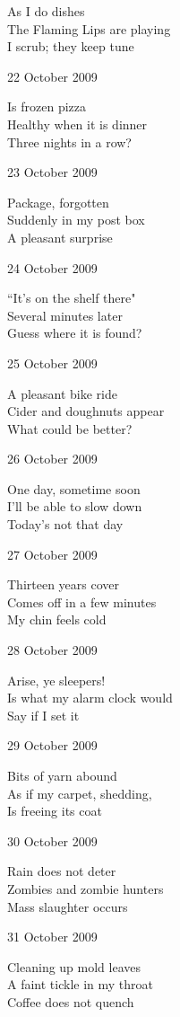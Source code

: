 \documentclass[12pt]{article}
\begin{document}
As I do dishes \\
The Flaming Lips are playing \\
I scrub; they keep tune

22 October 2009
 
Is frozen pizza \\
Healthy when it is dinner \\
Three nights in a row?
 
 23 October 2009

 Package, forgotten \\
 Suddenly in my post box \\
 A pleasant surprise

 24 October 2009

 ``It's on the shelf there" \\
 Several minutes later \\
 Guess where it is found?

\newpage

25 October 2009

A pleasant bike ride \\
Cider and doughnuts appear \\
What could be better?

26 October 2009

One day, sometime soon \\
I'll be able to slow down \\
Today's not that day

27 October 2009

Thirteen years cover \\
Comes off in a few minutes \\
My chin feels cold

28 October 2009

Arise, ye sleepers! \\
Is what my alarm clock would  \\
Say if I set it

29 October 2009

Bits of yarn abound \\
As if my carpet, shedding, \\
Is freeing its coat

30 October 2009

Rain does not deter \\
Zombies and zombie hunters \\
Mass slaughter occurs

31 October 2009

Cleaning up mold leaves \\
A faint tickle in my throat \\
Coffee does not quench
\end{document}
